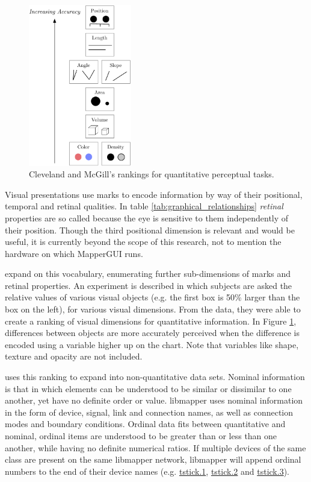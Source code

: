 \begin{figure}
	\centering
		\includegraphics[width=0.4\textwidth]{figures/accuracy_of_visual_dimensions}
		\caption{Cleveland and McGill's rankings for quantitative perceptual tasks.}
		\label{fig:accuracy_of_visual_dimensions}
\end{figure}

Visual presentations use marks to encode information by way of their positional, temporal and retinal qualities. In table \ref{tab:graphical_relationships} \emph{retinal} properties are so called because the eye is sensitive to them independently of their position. Though the third positional dimension is relevant and would be useful, it is currently beyond the scope of this research, not to mention the hardware on which MapperGUI runs. 


 expand on this vocabulary, enumerating further sub-dimensions of marks and retinal properties. An experiment is described in which subjects are asked the relative values of various visual objects (e.g. the first box is 50\% larger than the box on the left), for various visual dimensions. From the data, they were able to create a ranking of visual dimensions for quantitative information. In Figure \ref{fig:accuracy_of_visual_dimensions}, differences between objects are more accurately perceived when the difference is encoded using a variable higher up on the chart. Note that variables like shape, texture and opacity are not included. 

 uses this ranking to expand into non-quantitative data sets. Nominal information is that in which elements can be understood to be similar or dissimilar to one another, yet have no definite order or value. libmapper uses nominal information in the form of device, signal, link and connection names, as well as connection modes and boundary conditions. Ordinal data fits between quantitative and nominal, ordinal items are understood to be greater than or less than one another, while having no definite numerical ratios. If multiple devices of the same class are present on the same libmapper network, libmapper will append ordinal numbers to the end of their device names (e.g. \url{tstick.1}, \url{tstick.2} and \url{tstick.3}).


